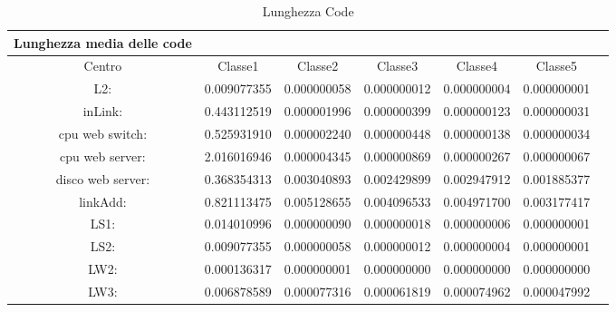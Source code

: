 \begin{table}[htbp]
\begin{center}
\begin{tabular}{||c|c|c|c|c|c|c||}
\hline
Lunghezza media delle code\\
\hline
Centro &Classe1 &Classe2 &Classe3 &Classe4 &Classe5\\
\hline
\hline
L2: &0.009077355 &0.000000058 &0.000000012 &0.000000004 &0.000000001\\
\hline
inLink: &0.443112519 &0.000001996 &0.000000399 &0.000000123 &0.000000031\\
\hline
cpu web switch: &0.525931910 &0.000002240 &0.000000448 &0.000000138 &0.000000034\\
\hline
cpu web server: &2.016016946 &0.000004345 &0.000000869  &0.000000267 &0.000000067\\
\hline
disco web server: &0.368354313 &0.003040893 &0.002429899 &0.002947912 &0.001885377\\
\hline
linkAdd: &0.821113475 &0.005128655 &0.004096533 &0.004971700 &0.003177417\\
\hline
LS1: &0.014010996 &0.000000090 &0.000000018 &0.000000006 &0.000000001\\
\hline
LS2: &0.009077355 &0.000000058 &0.000000012 &0.000000004 &0.000000001\\
\hline
LW2: &0.000136317 &0.000000001 &0.000000000 &0.000000000 &0.000000000\\
\hline
LW3: &0.006878589 &0.000077316 &0.000061819 &0.000074962 &0.000047992\\
\hline
\hline
\end{tabular}
\end{center}
\caption{Lunghezza Code}
\label{lunghezzacode}
\end{table}

